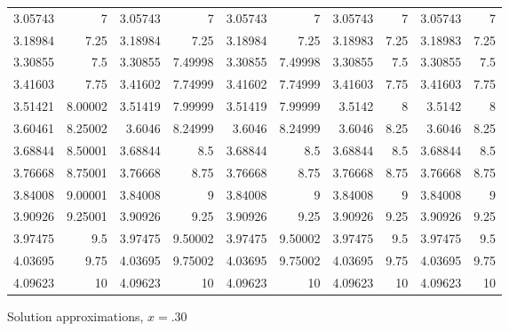 \documentclass[10pt,letterpaper]{article}
\begin{document}
\begin{figure}
\begin{tabular}{rrrrrrrrrr}
 3.05743   &  7        &    3.05743   &     7        &        3.05743   &         7        & 3.05743   &  7       &    3.05743   &      7       \\
 3.18984   &  7.25     &    3.18984   &     7.25     &        3.18984   &         7.25     & 3.18983   &  7.25    &    3.18983   &      7.25    \\
 3.30855   &  7.5      &    3.30855   &     7.49998  &        3.30855   &         7.49998  & 3.30855   &  7.5     &    3.30855   &      7.5     \\
 3.41603   &  7.75     &    3.41602   &     7.74999  &        3.41602   &         7.74999  & 3.41603   &  7.75    &    3.41603   &      7.75    \\
 3.51421   &  8.00002  &    3.51419   &     7.99999  &        3.51419   &         7.99999  & 3.5142    &  8       &    3.5142    &      8       \\
 3.60461   &  8.25002  &    3.6046    &     8.24999  &        3.6046    &         8.24999  & 3.6046    &  8.25    &    3.6046    &      8.25    \\
 3.68844   &  8.50001  &    3.68844   &     8.5      &        3.68844   &         8.5      & 3.68844   &  8.5     &    3.68844   &      8.5     \\
 3.76668   &  8.75001  &    3.76668   &     8.75     &        3.76668   &         8.75     & 3.76668   &  8.75    &    3.76668   &      8.75    \\
 3.84008   &  9.00001  &    3.84008   &     9        &        3.84008   &         9        & 3.84008   &  9       &    3.84008   &      9       \\
 3.90926   &  9.25001  &    3.90926   &     9.25     &        3.90926   &         9.25     & 3.90926   &  9.25    &    3.90926   &      9.25    \\
 3.97475   &  9.5      &    3.97475   &     9.50002  &        3.97475   &         9.50002  & 3.97475   &  9.5     &    3.97475   &      9.5     \\
 4.03695   &  9.75     &    4.03695   &     9.75002  &        4.03695   &         9.75002  & 4.03695   &  9.75    &    4.03695   &      9.75    \\
 4.09623   & 10        &    4.09623   &    10        &        4.09623   &        10        & 4.09623   & 10       &    4.09623   &     10       \\
\hline
\end{tabular}
\caption{Solution approximations, $x=.30$}
\end{figure}
\end{document}
